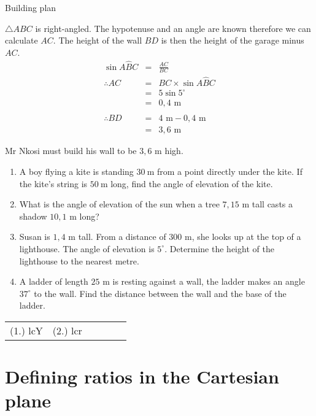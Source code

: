 \begin{wex}{Building plan}
{}{
$\triangle ABC$ is right-angled. The hypotenuse and an angle are known therefore we can calculate $AC$. The height of the wall $BD$ is then the height of the garage minus $AC$.
\begin{eqnarray*}
 \sin A\hat{B}C &=& \frac{AC}{BC} \\
\therefore AC &=& BC \times \sin A\hat{B}C\\
&=& 5 \sin 5^{\circ}\\
&=& 0,4\mbox{ m}\\
\\
\therefore BD&=& 4\mbox{ m}-0,4\mbox{ m}\\
&=& 3,6\mbox{ m}
\end{eqnarray*}


Mr Nkosi must build his wall to be $3,6$ m high.
}
\end{wex}

\begin{exercises}{}
{
\begin{enumerate}[noitemsep, label=\textbf{\arabic*}. ] 

\item A boy flying a kite is standing $30~$m from a point directly under the kite. If the kite's string is $50~$m long, find the angle of elevation of the kite.
\item What is the angle of elevation of the sun when a tree $7,15$ m tall casts a shadow $10,1$ m long?
\item Susan is $1,4$ m tall. From a distance of $300$ m, she looks up at the top of a lighthouse. The angle of elevation is $5^{\circ}$. Determine the height of the lighthouse to the nearest metre.
\item A ladder of length $25$ m is resting against a wall, the ladder makes an angle $37^{\circ}$ to the wall. Find the distance between the wall and the base of the ladder. 

\end{enumerate}

\practiceinfo
\par 
\par \begin{tabular}[h]{cccccc}
(1.) lcY  &  (2.) lcr  & \end{tabular}
    
}
\end{exercises} 

\section{Defining ratios in the Cartesian plane}

